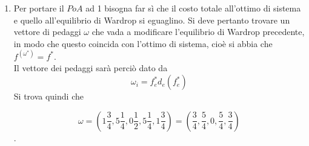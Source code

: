 \documentclass[13pt,largemargins]{homework}
\begin{document}
\begin{enumerate}[label=(\alph*)]
\item Per portare il \(PoA\) ad 1 bisogna far sì che il costo totale all'ottimo di sistema e quello all'equilibrio di Wardrop si eguaglino. Si deve pertanto trovare un vettore di pedaggi \(\omega \) che vada a modificare l'equilibrio di Wardrop precedente, in modo che questo coincida con l'ottimo di sistema, cioè si abbia che \(f^{(\omega^*)} = f^* \).\\ Il vettore dei pedaggi sarà perciò dato da \[ \omega_i =f_e^* d_e (f_e^*)\]
Si trova quindi che 
\begin{center}
\[\omega = (1\frac{3}{4}, 5\frac{1}{4}, 0\frac{1}{2}, 5\frac{1}{4}, 1\frac{3}{4}) = (\frac{3}{4},\frac{5}{4},0,\frac{5}{4},\frac{3}{4})\].  
\end{center}

\end{enumerate}

\newpage
\end{document}

